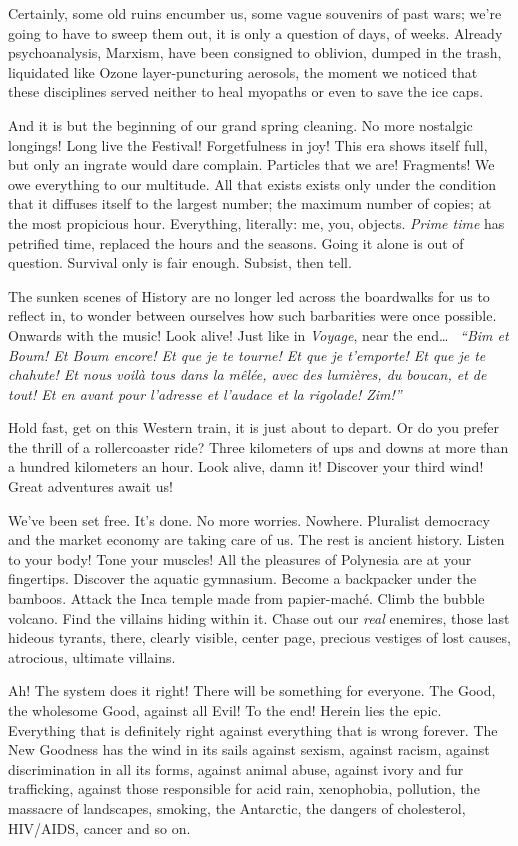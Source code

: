 Certainly, some old ruins encumber us, some vague souvenirs of past wars; we're going to have to sweep them out, it is only a question of days, of weeks. Already psychoanalysis, Marxism, have been consigned to oblivion, dumped in the trash, liquidated like Ozone layer-puncturing aerosols, the moment we noticed that these disciplines served neither to heal myopaths or even to save the ice caps.

And it is but the beginning of our grand spring cleaning. No more nostalgic longings! Long live the Festival! Forgetfulness in joy! This era shows itself full, but only an ingrate would dare complain. Particles that we are! Fragments! We owe everything to our multitude. All that exists exists only under the condition that it diffuses itself to the largest number; the maximum number of copies; at the most propicious hour. Everything, literally: me, you, objects. \textit{Prime time} has petrified time, replaced the hours and the seasons. Going it alone is out of question. Survival only is fair enough. Subsist, then tell.

The sunken scenes of History are no longer led across the boardwalks for us to reflect in, to wonder between ourselves how such barbarities were once possible. Onwards with the music! Look alive! Just like in \textit{Voyage}, near the end\dots~ \textit{``Bim et Boum! Et Boum encore! Et que je te tourne! Et que je t’emporte! Et que je te chahute! Et nous voilà tous dans la m\^el\'ee, avec des lumi\`eres, du boucan, et de tout! Et en avant pour l’adresse et l’audace et la rigolade! Zim!''}

Hold fast, get on this Western train, it is just about to depart. Or do you prefer the thrill of a rollercoaster ride? Three kilometers of ups and downs at more than a hundred kilometers an hour. Look alive, damn it! Discover your third wind! Great adventures await us!

We've been set free. It's done. No more worries. Nowhere. Pluralist democracy and the market economy are taking care of us. The rest is ancient history. Listen to your body! Tone your muscles! All the pleasures of Polynesia are at your fingertips. Discover the aquatic gymnasium. Become a backpacker under the bamboos. Attack the Inca temple made from papier-mach\'e. Climb the bubble volcano. Find the villains hiding within it. Chase out our \textit{real} enemires, those last hideous tyrants, there, clearly visible, center page, precious vestiges of lost causes, atrocious, ultimate villains.

Ah! The system does it right! There will be something for everyone. The Good, the wholesome Good, against all Evil! To the end! Herein lies the epic. Everything that is definitely right against everything that is wrong forever. The New Goodness has the wind in its sails against sexism, against racism, against discrimination in all its forms, against animal abuse, against ivory and fur trafficking, against those responsible for acid rain, xenophobia, pollution, the massacre of landscapes, smoking, the Antarctic, the dangers of cholesterol, HIV/AIDS, cancer and so on.

